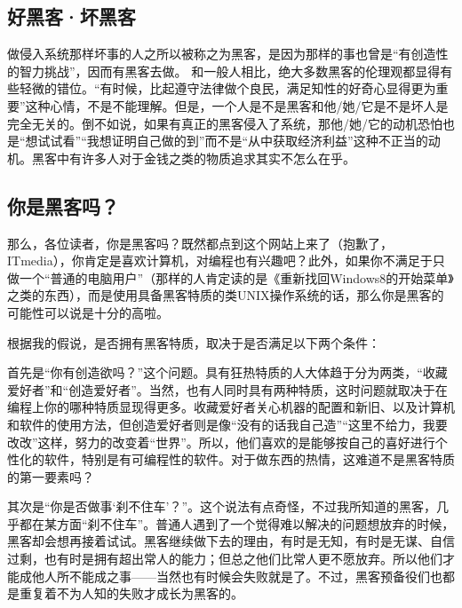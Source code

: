 \documentclass[a4paper,12pt]{article}
\begin{document}
\subsection{好黑客·坏黑客}
做侵入系统那样坏事的人之所以被称之为黑客，是因为那样的事也曾是“有创造性的智力挑战”，因而有黑客去做。
和一般人相比，绝大多数黑客的伦理观都显得有些轻微的错位。“有时候，比起遵守法律做个良民，满足知性的好奇心显得更为重要”这种心情，不是不能理解。但是，一个人是不是黑客和他/她/它是不是坏人是完全无关的。倒不如说，如果有真正的黑客侵入了系统，那他/她/它的动机恐怕也是“想试试看”“我想证明自己做的到”而不是“从中获取经济利益”这种不正当的动机。黑客中有许多人对于金钱之类的物质追求其实不怎么在乎。

\subsection{你是黑客吗？}
那么，各位读者，你是黑客吗？既然都点到这个网站上来了（抱歉了，ITmedia），你肯定是喜欢计算机，对编程也有兴趣吧？此外，如果你不满足于只做一个“普通的电脑用户”（那样的人肯定读的是《重新找回Windows8的开始菜单》之类的东西），而是使用具备黑客特质的类UNIX操作系统的话，那么你是黑客的可能性可以说是十分的高啦。

根据我的假说，是否拥有黑客特质，取决于是否满足以下两个条件：

首先是“你有创造欲吗？”这个问题。具有狂热特质的人大体趋于分为两类，“收藏爱好者”和“创造爱好者”。当然，也有人同时具有两种特质，这时问题就取决于在编程上你的哪种特质显现得更多。收藏爱好者关心机器的配置和新旧、以及计算机和软件的使用方法，但创造爱好者则是像“没有的话我自己造”“这里不给力，我要改改”这样，努力的改变着“世界”。所以，他们喜欢的是能够按自己的喜好进行个性化的软件，特别是有可编程性的软件。对于做东西的热情，这难道不是黑客特质的第一要素吗？

其次是“你是否做事‘刹不住车’？”。这个说法有点奇怪，不过我所知道的黑客，几乎都在某方面“刹不住车”。普通人遇到了一个觉得难以解决的问题想放弃的时候，黑客却会想再接着试试。黑客继续做下去的理由，有时是无知，有时是无谋、自信过剩，也有时是拥有超出常人的能力；但总之他们比常人更不愿放弃。所以他们才能成他人所不能成之事——当然也有时候会失败就是了。不过，黑客预备役们也都是重复着不为人知的失败才成长为黑客的。
\end{document}
